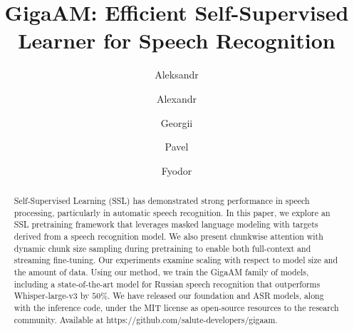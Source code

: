 \documentclass{Interspeech}
\title{GigaAM: Efficient Self-Supervised Learner for Speech Recognition}
\author[]{Aleksandr}{Kutsakov}
\author[]{Alexandr}{Maximenko}
\author[]{Georgii}{Gospodinov}
\author[]{Pavel}{Bogomolov}
\author[]{Fyodor}{Minkin}
\affiliation[nocounter]{}{SaluteDevices}{Russia}
\begin{document}
\maketitle

\begin{abstract}
Self-Supervised Learning (SSL) has demonstrated strong performance in speech processing, particularly in automatic speech recognition. In this paper, we explore an SSL pretraining framework that leverages masked language modeling with targets derived from a speech recognition model. We also present chunkwise attention with dynamic chunk size sampling during pretraining to enable both full-context and streaming fine-tuning. Our experiments examine scaling with respect to model size and the amount of data. Using our method, we train the GigaAM family of models, including a state-of-the-art model for Russian speech recognition that outperforms Whisper-large-v3 by $50\%$. We have released our foundation and ASR models, along with the inference code, under the MIT license as open-source resources to the research community. Available at https://github.com/salute-developers/gigaam.
\end{abstract}



\end{document}
